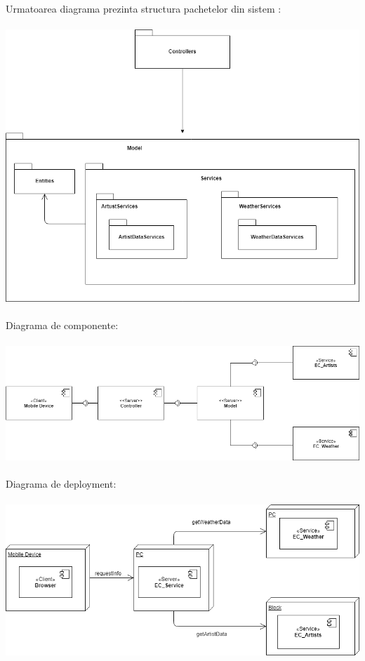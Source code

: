 \documentclass[11pt,a4paper,twoside,notitlepage]{article}
\begin{document}
Urmatoarea diagrama prezinta structura pachetelor din sistem : \\
\\
\includegraphics[height=.4\textheight, width=.8\textwidth]{packages} \\
\\
Diagrama de componente: \\
\\
\includegraphics[width=.6\textheight]{components} \\
\\
Diagrama de deployment: \\
\\
\includegraphics[width=.6\textheight]{deployment} \\
\end{document}

